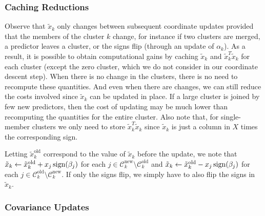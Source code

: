 \subsubsection{Caching Reductions}

Observe that \(\tilde x_k\) only changes between subsequent coordinate updates provided that the members of the cluster \(k\) change, for instance if two clusters are merged, a predictor leaves a cluster, or the signs flip (through an update of \(\alpha_k\)).
As a result, it is possible to obtain computational gains by caching \(\tilde x_k\) and \(\tilde x_k^T \tilde x_k\) for each cluster (except the zero cluster, which we do not consider in our coordinate descent step).
When there is no change in the clusters, there is no need to recompute these quantities.
And even when there are changes, we can still reduce the costs involved since \(\tilde x_k\) can be updated in place.
If a large cluster is joined by few new predictors, then the cost of updating may be much lower than recomputing the quantities for the entire cluster.
Also note that, for single-member clusters we only need to store \(\tilde x_k^T \tilde x_k\) since \(\tilde x_k\) is just a column in \(X\) times the corresponding sign.

Letting \(\tilde x_k^\text{old}\) correspond to the value of \(\tilde x_k\) before the update, we note that \(\tilde x_k \gets \tilde x_k^\text{old} + x_j \operatorname{sign}(\beta_j)\) for each \(j \in \mathcal{C}_k^\text{new} \setminus \mathcal{C}_k^\text{old}\) and \(\tilde x_k \gets \tilde x_k^\text{old} - x_j \operatorname{sign}(\beta_j)\) for each \(j \in \mathcal{C}_k^\text{old} \setminus \mathcal{C}_k^\text{new}\).
If only the signs flip, we simply have to also flip the signs in \(\tilde x_k\).

\subsubsection{Covariance Updates}

